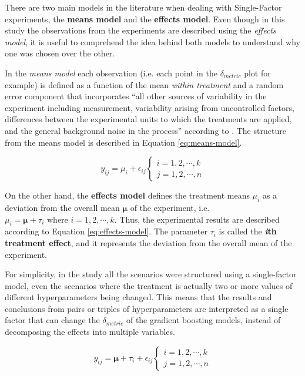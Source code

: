 There are two main models in the literature when dealing with Single-Factor experiments, the \textbf{means model} and the \textbf{effects model}. Even though in this study the observations from the experiments are described using the \textit{effects model}, it is useful to comprehend the idea behind both models to understand why one was chosen over the other.

In the \textit{means model} each observation (i.e. each point in the $\delta_{metric}$ plot for example) is defined as a function of the mean \textit{within treatment} and a random error component that incorporates ``all other sources of variability in the experiment including measurement, variability arising from uncontrolled factors, differences between the experimental units to which the treatments are applied, and the general background noise in the process'' according to \cite{montgomery2017design}. The structure from the means model is described in Equation \ref{eq:means-model}.

\begin{equation}\label{eq:means-model}
    y_{ij} = \mu_i + \epsilon_{ij}
    \begin{cases}
        i = 1, 2, \cdots , k\\
        j = 1, 2, \cdots, n
    \end{cases}
\end{equation}

On the other hand, the \textbf{effects model} defines the treatment means $\mu_i$ as a deviation from the overall mean $\bm{\mu}$ of the experiment, i.e. $\mu_i = \bm{\mu}+ \tau_i \text{ where } i = 1, 2, \cdots, k$. Thus, the experimental results are described according to Equation \ref{eq:effects-model}. The parameter $\tau_i$ is called the \textbf{\textit{i}th treatment effect}, and it represents the deviation from the overall mean of the experiment.

For simplicity, in the study all the scenarios were structured using a single-factor model, even the scenarios where the treatment is actually two or more values of different hyperparameters being changed. This means that the results and conclusions from pairs or triples of hyperparameters are interpreted as a single factor that can change the $\delta_{metric}$ of the gradient boosting models, instead of decomposing the effects into multiple variables.

\begin{equation}\label{eq:effects-model}
    y_{ij} = \bm{\mu} + \tau_i + \epsilon_{ij}
    \begin{cases}
        i = 1, 2, \cdots , k\\
        j = 1, 2, \cdots, n
    \end{cases}
\end{equation}

